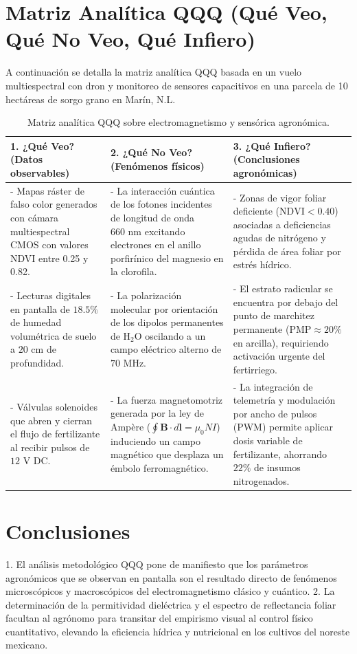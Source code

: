 \documentclass[12pt,spanish,letterpaper,oneside]{article}
\begin{document}
\section{Matriz Analítica QQQ (Qué Veo, Qué No Veo, Qué Infiero)}
A continuación se detalla la matriz analítica QQQ basada en un vuelo multiespectral con dron y monitoreo de sensores capacitivos en una parcela de 10 hectáreas de sorgo grano en Marín, N.L.

\begin{table}[htbp]
\centering
\small
\caption{Matriz analítica QQQ sobre electromagnetismo y sensórica agronómica.}
\label{tab:matriz-qqq}
\begin{tabularx}{\textwidth}{@{}Y Y Y@{}}
\toprule
\textbf{1. ¿Qué Veo? (Datos observables)} & \textbf{2. ¿Qué No Veo? (Fenómenos físicos)} & \textbf{3. ¿Qué Infiero? (Conclusiones agronómicas)} \\
\midrule
- Mapas ráster de falso color generados con cámara multiespectral CMOS con valores NDVI entre 0.25 y 0.82. &
- La interacción cuántica de los fotones incidentes de longitud de onda $660\text{ nm}$ excitando electrones en el anillo porfirínico del magnesio en la clorofila. &
- Zonas de vigor foliar deficiente ($\mathrm{NDVI} < 0.40$) asociadas a deficiencias agudas de nitrógeno y pérdida de área foliar por estrés hídrico. \\
\addlinespace
- Lecturas digitales en pantalla de $18.5\%$ de humedad volumétrica de suelo a $20\text{ cm}$ de profundidad. &
- La polarización molecular por orientación de los dipolos permanentes de $\mathrm{H}_2\mathrm{O}$ oscilando a un campo eléctrico alterno de $70\text{ MHz}$. &
- El estrato radicular se encuentra por debajo del punto de marchitez permanente ($\mathrm{PMP} \approx 20\%$ en arcilla), requiriendo activación urgente del fertirriego. \\
\addlinespace
- Válvulas solenoides que abren y cierran el flujo de fertilizante al recibir pulsos de $12\text{ V DC}$. &
- La fuerza magnetomotriz generada por la ley de Ampère ($\oint \mathbf{B}\cdot d\mathbf{l} = \mu_0 N I$) induciendo un campo magnético que desplaza un émbolo ferromagnético. &
- La integración de telemetría y modulación por ancho de pulsos (PWM) permite aplicar dosis variable de fertilizante, ahorrando $22\%$ de insumos nitrogenados. \\
\bottomrule
\end{tabularx}
\end{table}

\section{Conclusiones}
1. El análisis metodológico QQQ pone de manifiesto que los parámetros agronómicos que se observan en pantalla son el resultado directo de fenómenos microscópicos y macroscópicos del electromagnetismo clásico y cuántico.
2. La determinación de la permitividad dieléctrica y el espectro de reflectancia foliar facultan al agrónomo para transitar del empirismo visual al control físico cuantitativo, elevando la eficiencia hídrica y nutricional en los cultivos del noreste mexicano.

\newpage
\printbibliography[title={Referencias bibliográficas}]
\end{document}
